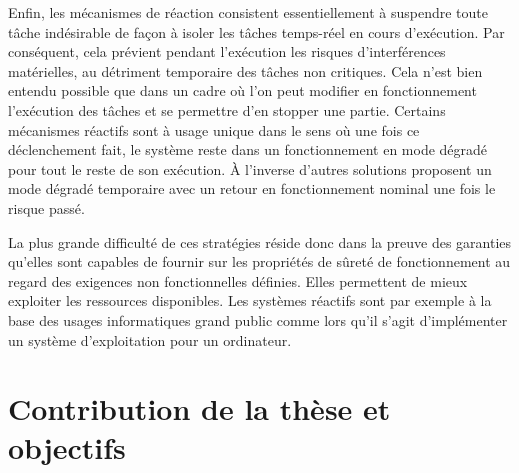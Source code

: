 \documentclass[french, a4paper, 11pt, twoside, pdftex]{StyleThese}
\begin{document}
		Enfin, les mécanismes de réaction consistent essentiellement à suspendre toute tâche indésirable de façon à isoler les tâches temps-réel en cours d'exécution. Par conséquent, cela prévient pendant l'exécution les risques d'interférences matérielles, au détriment temporaire des tâches non critiques. Cela n'est bien entendu possible que dans un cadre où l'on peut modifier en fonctionnement l'exécution des tâches et se permettre d'en stopper une partie. Certains mécanismes réactifs sont à usage unique dans le sens où une fois ce déclenchement fait, le système reste dans un fonctionnement en mode dégradé pour tout le reste de son exécution. À l'inverse d'autres solutions proposent un mode dégradé temporaire avec un retour en fonctionnement nominal une fois le risque passé. 
		
		La plus grande difficulté de ces stratégies réside donc dans la preuve des garanties qu'elles sont capables de fournir sur les propriétés de sûreté de fonctionnement au regard des exigences non fonctionnelles définies. Elles permettent de mieux exploiter les ressources disponibles. Les systèmes réactifs sont par exemple à la base des usages informatiques grand public comme lors qu'il s'agit d'implémenter un système d'exploitation pour un ordinateur. 


\section{Contribution de la thèse et objectifs}
\end{document}
